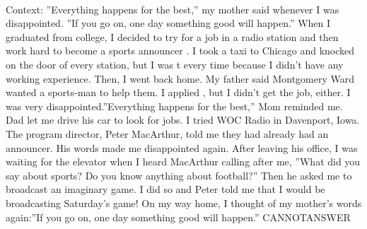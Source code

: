 \documentclass[11pt,a4paper, onecolumn]{article}
\begin{document}
\\ Context: ''Everything happens for the best,'' my mother said whenever I was disappointed. ''If you go on, one day something good will happen.'' When I graduated from college, I decided to try for a job in a radio station and then work hard to become a sports announcer . I took a taxi to Chicago and knocked on the door of every station, but I was t   every time because I didn't have any working experience. Then, I went back home. My father said Montgomery Ward wanted a sports-man to help them. I applied , but I didn't get the job, either. I was very disappointed.''Everything happens for the best,'' Mom reminded me. Dad let me drive his car to look for jobs. I tried WOC Radio in Davenport, Iowa. The program director, Peter MacArthur, told me they had already had an announcer. His words made me disappointed again. After leaving his office, I was waiting for the elevator when I heard MacArthur calling after me, ''What did you say about sports? Do you know anything about football?'' Then he asked me to broadcast an imaginary game. I did so and Peter told me that I would be broadcasting Saturday's game! On my way home, I thought of my mother's words again:''If you go on, one day something good will happen.'' CANNOTANSWER
\end{document}
